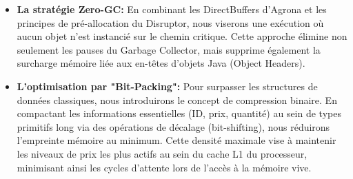 \begin{itemize}
\item \textbf{La stratégie Zero-GC:} En combinant les DirectBuffers d'Agrona et les principes de pré-allocation du Disruptor, nous viserons une exécution où aucun objet n'est instancié sur le chemin critique. Cette approche élimine non seulement les pauses du Garbage Collector, mais supprime également la surcharge mémoire liée aux en-têtes d'objets Java (Object Headers).

\item \textbf{L'optimisation par "Bit-Packing":} Pour surpasser les structures de données classiques, nous introduirons le concept de compression binaire. En compactant les informations essentielles (ID, prix, quantité) au sein de types primitifs long via des opérations de décalage (bit-shifting), nous réduirons l'empreinte mémoire au minimum. Cette densité maximale vise à maintenir les niveaux de prix les plus actifs au sein du cache L1 du processeur, minimisant ainsi les cycles d'attente lors de l'accès à la mémoire vive.
\end{itemize}